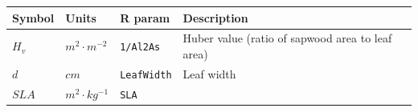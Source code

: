 \documentclass[]{book}
\begin{document}
\begin{longtable}[]{@{}llll@{}}
\toprule
\begin{minipage}[b]{0.11\columnwidth}\raggedright
Symbol\strut
\end{minipage} & \begin{minipage}[b]{0.10\columnwidth}\raggedright
Units\strut
\end{minipage} & \begin{minipage}[b]{0.12\columnwidth}\raggedright
R param\strut
\end{minipage} & \begin{minipage}[b]{0.45\columnwidth}\raggedright
Description\strut
\end{minipage}\tabularnewline
\midrule
\endhead
\begin{minipage}[t]{0.11\columnwidth}\raggedright
\(H_v\)\strut
\end{minipage} & \begin{minipage}[t]{0.10\columnwidth}\raggedright
\(m^2 \cdot m^{-2}\)\strut
\end{minipage} & \begin{minipage}[t]{0.12\columnwidth}\raggedright
\texttt{1/Al2As}\strut
\end{minipage} & \begin{minipage}[t]{0.45\columnwidth}\raggedright
Huber value (ratio of sapwood area to leaf area)\strut
\end{minipage}\tabularnewline
\begin{minipage}[t]{0.11\columnwidth}\raggedright
\(d\)\strut
\end{minipage} & \begin{minipage}[t]{0.10\columnwidth}\raggedright
\(cm\)\strut
\end{minipage} & \begin{minipage}[t]{0.12\columnwidth}\raggedright
\texttt{LeafWidth}\strut
\end{minipage} & \begin{minipage}[t]{0.45\columnwidth}\raggedright
Leaf width\strut
\end{minipage}\tabularnewline
\begin{minipage}[t]{0.11\columnwidth}\raggedright
\(SLA\)\strut
\end{minipage} & \begin{minipage}[t]{0.10\columnwidth}\raggedright
\(m^2 \cdot kg^{-1}\)\strut
\end{minipage} & \begin{minipage}[t]{0.12\columnwidth}\raggedright
\texttt{SLA}\strut
\end{minipage} & \begin{minipage}[t]{0.45\columnwidth}\raggedright

\end{minipage}
\end{longtable}
\end{document}
